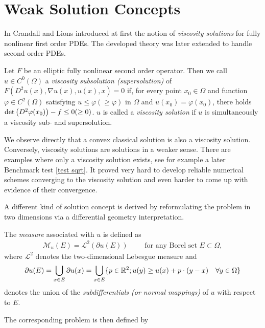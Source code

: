\section{Weak Solution Concepts}
In \cite{CL1983} Crandall and Lions introduced at first the notion of \emph{viscosity solutions} for fully nonlinear first order PDEs. The developed theory was later extended to handle second order PDEs.
\begin{definition}
	Let $F$ be an elliptic fully nonlinear second order operator.
	Then we call $u \in C^0(\Omega)$ a \emph{viscosity subsolution (supersolution)} of $F(D^2u(x), \nabla u(x), u(x), x)=0$  if, for every point $x_0 \in \Omega$ and function $\varphi \in C^2(\Omega)$ satisfying $u \leq \varphi (\geq \varphi)$ in $\Omega$ and $u(x_0) = \varphi(x_0)$, there holds $\det{\left(D^2 \varphi(x_0)\right)} - f \leq 0 (\geq 0)$. 
	$u$ is called a \emph{viscosity solution} if $u$ is simultaneously a viscosity sub- and supersolution.
\end{definition}

We observe directly that a convex classical solution is also a viscosity solution. Conversely, viscosity solutions are solutions in a weaker sense. There are examples where only a viscosity solution exists, see for example a later Benchmark test \ref{test sqrt}.
It proved very hard to develop reliable numerical schemes converging to the viscosity solution and even harder to come up with evidence of their convergence.

A different kind of solution concept is derived by reformulating the \MA problem in two dimensions via a differential geometry interpretation.

\begin{definition}\label{def:MA measure}
	The \emph{\MA measure} associated with $u$ is defined as 
	\begin{align}
		\mathcal{M}_u (E) = \mathcal{L}^2(\partial u(E)) \qquad \text{ for any Borel set } E \subset \Omega,
	\end{align}
	where $\mathcal{L}^2$ denotes the two-dimensional Lebesgue measure and 
	\[
		\partial u(E) = \bigcup_{x \in E} \partial u (x) = \bigcup_{x \in E} \{p \in \mathbb{R}^2; u(y) \geq u(x) +p\cdot (y-x) \quad \forall y \in \Omega\}
	\]
	denotes the union of the \emph{subdifferentials (or normal mappings)} of $u$ with respect to $E$.
\end{definition}
The corresponding \MA problem is then defined by

